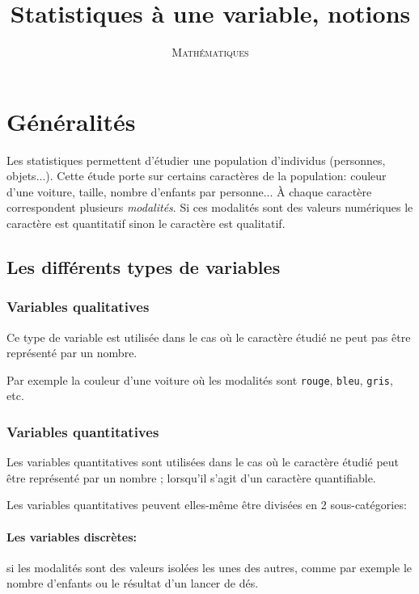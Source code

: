 \documentclass[a4paper,12pt]{scrartcl}
\title{Statistiques à une variable, notions}
\author{\textsc{Mathématiques}}
\date{}
\begin{document}
 

\maketitle

\tableofcontents 

\section{Généralités} 

Les statistiques permettent d'étudier une population d'individus (personnes, objets...). Cette étude porte sur certains caractères de la population: couleur d'une voiture, taille, nombre d'enfants par personne...
À chaque caractère correspondent plusieurs \emph{modalités}. Si ces modalités sont des valeurs numériques le caractère est quantitatif sinon le caractère est qualitatif.

\subsection{Les différents types de variables}

\subsubsection{Variables qualitatives}

Ce type de variable est utilisée dans le cas où le caractère étudié ne peut pas être représenté par un nombre.

Par exemple la couleur d'une voiture où les modalités sont \texttt{rouge}, \texttt{bleu}, \texttt{gris}, etc.


\subsubsection{Variables quantitatives}

Les variables quantitatives sont utilisées dans le cas où le caractère étudié peut être représenté par un nombre ; lorsqu'il s'agit d'un caractère quantifiable. 

Les variables quantitatives peuvent elles-même être divisées en 2 sous-catégories:

\paragraph{Les variables discrètes:} si les modalités sont des valeurs isolées les unes des autres, comme par exemple le nombre d'enfants ou le résultat d'un lancer de dés.
\end{document}
